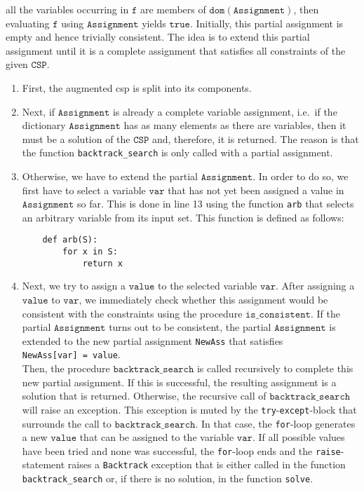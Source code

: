 all the variables occurring in $\texttt{f}$ are members of $\texttt{dom}(\texttt{Assignment})$, then evaluating
$\texttt{f}$ using $\texttt{Assignment}$ yields $\texttt{true}$.  Initially, this partial assignment is empty
and hence trivially consistent.  The idea is to extend this partial assignment until it is a complete
assignment that satisfies all constraints of the given $\texttt{CSP}$.
\begin{enumerate}
\item First, the augmented \ac{csp} is split into its components.
\item Next, if $\texttt{Assignment}$ is already a complete variable assignment, i.e.~if the dictionary
      $\texttt{Assignment}$ has as many elements as there are variables, then it must be a solution of
      the $\texttt{CSP}$ and, therefore, it is returned.  The reason is that the function
      \texttt{backtrack\_search} is only called with a  partial assignment.
\item Otherwise, we have to extend the partial $\texttt{Assignment}$.  In order to do so, we first have to
      select a variable $\texttt{var}$ that has not yet been assigned a value in $\texttt{Assignment}$ so far.
      This is done in line 13 using the function \texttt{arb} that selects an arbitrary variable
      from its input set.  This function is defined as follows:
\begin{verbatim}
    def arb(S):
        for x in S:
            return x
\end{verbatim}    
\item Next, we try to assign a $\texttt{value}$ to the selected variable $\texttt{var}$.  After assigning
      a $\texttt{value}$ to $\texttt{var}$, we immediately check whether this assignment would be consistent
      with the constraints using the procedure $\texttt{is\_consistent}$.
      If the partial $\texttt{Assignment}$ turns out to be consistent, the partial $\texttt{Assignment}$
      is extended to the new partial assignment \texttt{NewAss} that satisfies
      \\[0.2cm]
      \hspace*{1.3cm}
      \texttt{NewAss[var] = value}.
      \\[0.2cm]
      Then, the procedure $\texttt{backtrack\_search}$ is called recursively to complete this new partial assignment.
      If this is successful, the resulting assignment is a solution that is returned.  Otherwise,
      the recursive call of $\texttt{backtrack\_search}$ will raise an exception.  This exception is muted 
      by the \texttt{try}-\texttt{except}-block that surrounds the call to $\texttt{backtrack\_search}$.  In that case, the
      \texttt{for}-loop generates a new $\texttt{value}$ that can be assigned to the variable
      $\texttt{var}$.  If all possible values have been tried and none was successful, the \texttt{for}-loop
      ends and the \texttt{raise}-statement raises a \texttt{Backtrack} exception that is either called in the
      function \texttt{backtrack\_search} or, if there is no solution, in the function \texttt{solve}.
\end{enumerate}



